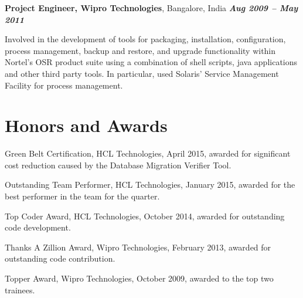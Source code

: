 \documentclass[margin]{resume}
\begin{document}
\begin{resume}
\textbf{Project Engineer, Wipro Technologies}, Bangalore, India \hfill \textbf{\textit{Aug 2009 -- May 2011}}\\
\vspace{-10pt}
\begin{list2}\item
Involved in the development of tools for packaging, installation,
configuration, process management, backup and restore, and upgrade
functionality within Nortel's OSR product suite using a combination of shell
scripts, java applications and other third party tools. In particular, used
Solaris' Service Management Facility for process management.
\end{list2}

\section{\mysidestyle Honors and Awards}
\begin{list2}

\item Green Belt Certification, HCL Technologies, April 2015, awarded for
significant cost reduction caused by the Database Migration Verifier Tool.

\item Outstanding Team Performer, HCL Technologies, January 2015, awarded for the
best performer in the team for the quarter.

\item Top Coder Award, HCL Technologies, October 2014, awarded for outstanding
code development.

\item Thanks A Zillion Award, Wipro Technologies, February 2013, awarded for
outstanding code contribution.

\item Topper Award, Wipro Technologies, October 2009, awarded to the top two
trainees.

\end{list2}


\end{resume}
\end{document}
